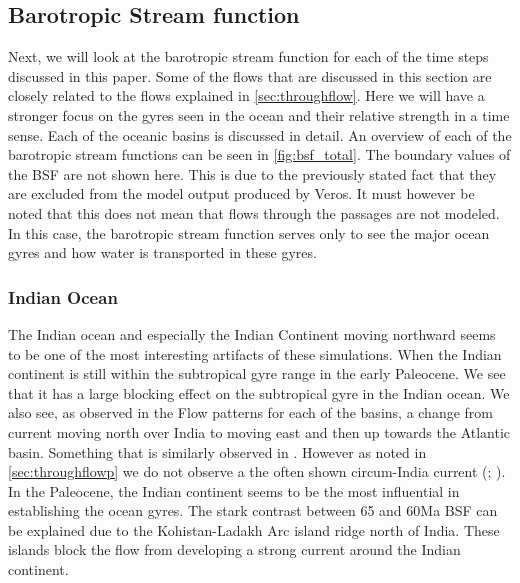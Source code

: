 \subsection{Barotropic Stream function}
\label{sec:BSF}


Next, we will look at the barotropic stream function for each of the time steps discussed in this paper. Some of the flows that are discussed in this section are closely related to the flows explained in \cref{sec:throughflow}. Here we will have a stronger focus on the gyres seen in the ocean and their relative strength in a time sense. Each of the oceanic basins is discussed in detail. An overview of each of the barotropic stream functions can be seen in \cref{fig:bsf_total}. The boundary values of the BSF are not shown here. This is due to the previously stated fact that they are excluded from the model output produced by Veros. It must however be noted that this does not mean that flows through the passages are not modeled. In this case, the barotropic stream function serves only to see the major ocean gyres and how water is transported in these gyres.

\subsubsection{Indian Ocean}
The Indian ocean and especially the Indian Continent moving northward seems to be one of the most interesting artifacts of these simulations. When the Indian continent is still within the subtropical gyre range in the early Paleocene. We see that it has a large blocking effect on the subtropical gyre in the Indian ocean. We also see, as observed in the Flow patterns for each of the basins, a change from current moving north over India to moving east and then up towards the Atlantic basin. Something that is similarly observed in \cite{omta2003physical}. However as noted in \cref{sec:throughflowp} we do not observe a the often shown circum-India current (\cite{omta2003physical};
\cite{von2006effect}). In the Paleocene, the Indian continent seems to be the most influential in establishing the ocean gyres. The stark contrast between 65 and 60Ma BSF can be explained due to the Kohistan-Ladakh Arc island ridge north of India. These islands block the flow from developing a strong current around the Indian continent. 


